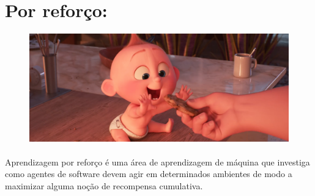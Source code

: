 \documentclass[12pt]{article}
\begin{document}
           \section{Por reforço:}
                \begin{figure}[ht]
                    \centering
                    \includegraphics[scale=0.2]{jack-jack-num-num-cookie_orig.png}
                \end{figure}
   
                \paragraph{}Aprendizagem por reforço é uma área de aprendizagem de máquina que investiga como agentes de software devem agir em determinados ambientes de modo a maximizar alguma noção de recompensa cumulativa.
         

  
\end{document}
